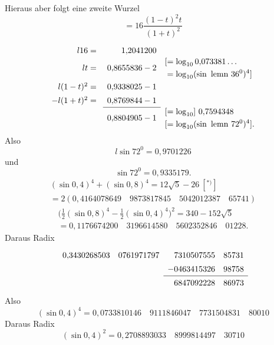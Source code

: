 \begingroup
\setlength{\headheight}{25pt}
\fancyhead{}
Hieraus aber folgt eine zweite Wurzel
\[=16\frac{(1-t)^2t}{(1+t)^2}\]
{\small\[\renewcommand{\arraystretch}{1.4}\begin{array}{rrl}
l16={}&1{,}2041200&\\
lt={}&0{,}8655836-2&\begin{aligned}&[=\log_{10}0{,}073381\ldots\\&=\log_{10}(\sin\text{ lemn }36^0)^4]\end{aligned}\\
l(1-t)^2={}&0{,}9338025-1&\\
-l(1+t)^2={}&0{,}8769844-1&\\\cline{2-2}
&0{,}8804905-1&\begin{aligned}&[=\log_{10}]\ 0{,}7594348\\&[=\log_{10}(\sin\text{ lemn }72^0)^4].\end{aligned}
\end{array}\]}
\noindent Also
\[l\sin72^0=0{,}9701226\]
\noindent und
\[\sin72^0=0{,}9335179.\]
{\small\[\begin{gathered}
(\sin0{,}4)^4+(\sin0{,}8)^4=12\surd5-26\ [^{*)}]\\
=2(0{,}4164078649\quad9873817845\quad5042012387\quad65741)
\end{gathered}\]}
{\small\[\begin{gathered}
\bigl(\tfrac12(\sin0{,}8)^4-\tfrac12(\sin0{,}4)^4\bigr)^2=340-152\surd5\\
=0{,}1176674200\quad3196614580\quad5602352846\quad01228.
\end{gathered}\]}
\noindent Daraus Radix
\[\begin{array}{rrrr}
0{,}3430268503&0761971797&7310507555&85731\\
&&-0463415326&98758\\\cline{3-4}
&&6847092228&86973
\end{array}\]
\noindent Also
\[(\sin0{,}4)^4=0{,}0733810146\quad9111846047\quad7731504831\quad80010\]
\noindent Daraus Radix
\[(\sin0{,}4)^2=0{,}2708893033\quad8999814497\quad30710\]
\renewcommand{\thefootnote}{[*)}\footnotetext{\(\sin0{,}4\) und \(\sin0{,}8\) bedeuten \(\sin\frac{4\varpi}{10}\) und \(\sin\frac{8\varpi}{10}\), d. h. also \(\sin\text{ lemn }\frac{2\varpi}{5}\) und \(\sin\text{ lemn }\frac{4\varpi}{5}\).]\par\medskip\noindent\hfill{\normalsize21\textsuperscript{*}}}
